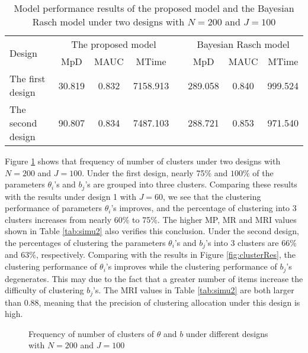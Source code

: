 \documentclass[12pt]{article}
\begin{document}
\begin{table}[h!]
	\centering
	\caption{Model performance results of the proposed model and the Bayesian Rasch model under two designs with $N=200$ and $J=100$}\label{tab:mpd2}
	\begin{tabular}{lccccccc}
		\toprule
		\multirow{2}{*}{Design} & \multicolumn{3}{c}{The proposed model } && \multicolumn{3}{c}{Bayesian Rasch model} \\
		\cline{2-4} \cline{6-8}
		& MpD & MAUC & MTime & & MpD & MAUC & MTime\\
		\midrule 
		The first design & 30.819 & 0.832 & 7158.913 && 289.058 & 0.840 & 999.524 \\
		The second design & 90.807 & 0.834 & 7487.103& & 288.721 & 0.853 & 971.540\\
		\bottomrule
	\end{tabular}
\end{table} 

Figure \ref{fig:clusterRes2} shows that frequency of number of clusters under two designs with $N=200$  and $J=100$. Under the first design, nearly 75\% and $100\%$ of the parameters $\theta_i$'s and $b_j$'s are grouped into three clusters. Comparing these results with the results under design 1 with $J =60$, we see that the clustering performance of parameters $\theta_i$'s improves, and the percentage of clustering into 3 clusters increases from nearly 60\% to 75\%. The higher MP, MR and MRI values shown in Table \ref{tab:simu2} also verifies this conclusion. 
Under the second design, the percentages of clustering the parameters $\theta_i$'s and $b_j$'s into 3 clusters are 66\% and 63\%, respectively. Comparing with the results in Figure \ref{fig:clusterRes}, the clustering performance of $\theta_i$'s improves while the clustering performance of $b_j$'s degenerates. This may due to the fact that a greater number of items increase the difficulty of clustering $b_j$'s.  The MRI values in Table \ref{tab:simu2} are both larger than 0.88, meaning that the precision of clustering allocation under this design is high. 


\begin{figure}[htbp] 
	\centering
	\quad
	\quad
	\quad
	\caption{Frequency of number of clusters of $\theta$ and $b$ under different designs with $N=200$ and $J=100$}
	\label{fig:clusterRes2}
\end{figure}
\end{document}
